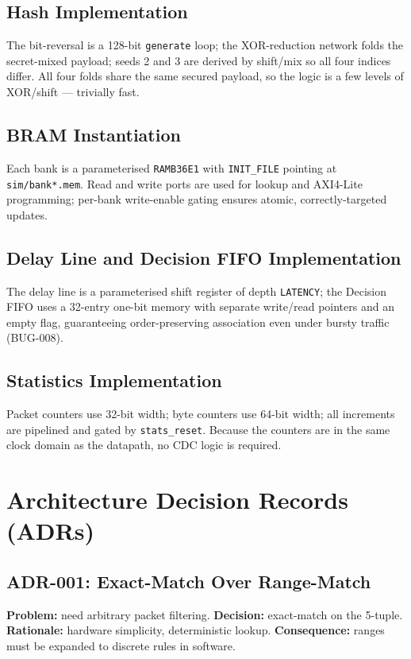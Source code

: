 \documentclass[12pt,twoside,openright]{book}
\begin{document}
\subsection{Hash Implementation}

The bit-reversal is a 128-bit \texttt{generate} loop; the XOR-reduction network folds the
secret-mixed payload; seeds 2 and 3 are derived by shift/mix so all four indices differ. All four
folds share the same secured payload, so the logic is a few levels of XOR/shift --- trivially fast.

\subsection{BRAM Instantiation}

Each bank is a parameterised \texttt{RAMB36E1} with \texttt{INIT\_FILE} pointing at
\texttt{sim/bank*.mem}. Read and write ports are used for lookup and AXI4-Lite programming;
per-bank write-enable gating ensures atomic, correctly-targeted updates.

\subsection{Delay Line and Decision FIFO Implementation}

The delay line is a parameterised shift register of depth \texttt{LATENCY}; the Decision FIFO uses
a 32-entry one-bit memory with separate write/read pointers and an empty flag, guaranteeing
order-preserving association even under bursty traffic (BUG-008).

\subsection{Statistics Implementation}

Packet counters use 32-bit width; byte counters use 64-bit width; all increments are pipelined and
gated by \texttt{stats\_reset}. Because the counters are in the same clock domain as the datapath,
no CDC logic is required.

\section{Architecture Decision Records (ADRs)}

\subsection{ADR-001: Exact-Match Over Range-Match}
\textbf{Problem:} need arbitrary packet filtering. \textbf{Decision:} exact-match on the 5-tuple.
\textbf{Rationale:} hardware simplicity, deterministic lookup. \textbf{Consequence:} ranges must be
expanded to discrete rules in software.
\end{document}
